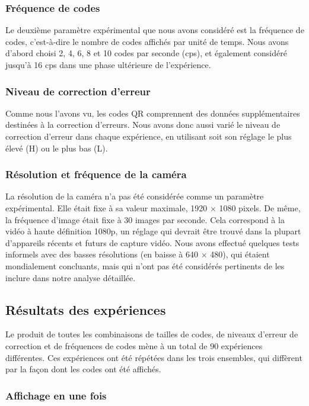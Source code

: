 \subsubsection{Fréquence de codes}

Le deuxième paramètre expérimental que nous avons considéré est la fréquence de codes, c'est-à-dire le nombre de codes affichés par unité de temps. Nous avons d'abord choisi 2, 4, 6, 8 et 10 codes par seconde (cps), et également considéré jusqu'à 16 cps dans une phase ultérieure de l'expérience.

\subsubsection{Niveau de correction d'erreur}

Comme nous l'avons vu, les codes QR comprennent des données supplémentaires destinées à la correction d'erreurs. Nous avons donc aussi varié le niveau de correction d'erreur dans chaque expérience, en utilisant soit son réglage le plus élevé (H) ou le plus bas (L).

\subsubsection{Résolution et fréquence de la caméra}

La résolution de la caméra n'a pas été considérée comme un paramètre expérimental. Elle était fixe à sa valeur maximale, 1920 $\times$ 1080 pixels. De même, la fréquence d'image était fixe à 30 images par seconde. Cela correspond à la vidéo à haute définition 1080p, un réglage qui devrait être trouvé dans la plupart d'appareils récents et futurs de capture vidéo. Nous avons effectué quelques tests informels avec des basses résolutions (en baisse à 640 $\times$ 480), qui étaient mondialement concluants, mais qui n'ont pas été considérés pertinents de les inclure dans notre analyse détaillée.

\subsection{Résultats des expériences}

Le produit de toutes les combinaisons de tailles de codes, de niveaux d'erreur de correction et de fréquences de codes mène à un total de 90 expériences différentes. Ces expériences ont été répétées dans les trois ensembles, qui diffèrent par la façon dont les codes ont été affichés.

\subsubsection{Affichage en une fois}

